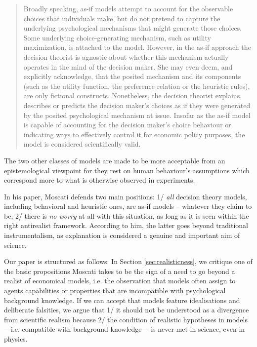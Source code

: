 \documentclass[a4paper,11pt]{article}
\theoremstyle{definition}
\begin{document}
\begin{quote}
    Broadly speaking, as-if models attempt to account for the observable choices that individuals make, but do not pretend to capture the underlying psychological mechanisms that might generate those choices. Some underlying choice-generating mechanism, such as utility maximization, is attached to the model. However, in the as-if approach the decision theorist is agnostic about whether this mechanism actually operates in the mind of the decision maker. She may even deem, and explicitly acknowledge, that the posited mechanism and its components (such as the utility function, the preference relation or the heuristic rules), are only fictional constructs. Nonetheless, the decision theorist explains, describes or predicts the decision maker’s choices as if they were generated by the posited psychological mechanism at issue. Insofar as the as-if model is capable of accounting for the decision maker’s choice behaviour or indicating ways to effectively control it for economic policy purposes, the model is considered scientifically valid.
\end{quote}

The two other classes of models are made to be more acceptable from an epistemological viewpoint for they rest on human behaviour's assumptions which correspond more to what is otherwise observed in experiments.

In his paper, Moscati defends two main positions: 1/ \textit{all} decision theory models, including behavioral and heuristic ones, are as-if models -- whatever they claim to be; 2/ there is \textit{no worry} at all with this situation, as long as it is seen within the right antirealist framework. According to him, the latter goes beyond traditional instrumentalism, as explanation is considered a genuine and important aim of science. %

Our paper is structured as follows. In Section \ref{sec:realisticness}, we critique one of the basic propositions Moscati takes to be the sign of a need to go beyond a realist of economical models, i.e. the observation that models often assign to agents capabilities or properties that are incompatible with psychological background knowledge. If we can accept that models feature idealisations and deliberate falsities, we argue that 1/ it should not be understood as a divergence from scientific realism because 2/ the condition of realistic hypotheses in models---i.e. compatible with background knowledge--- is never met in science, even in physics.
\end{document}
